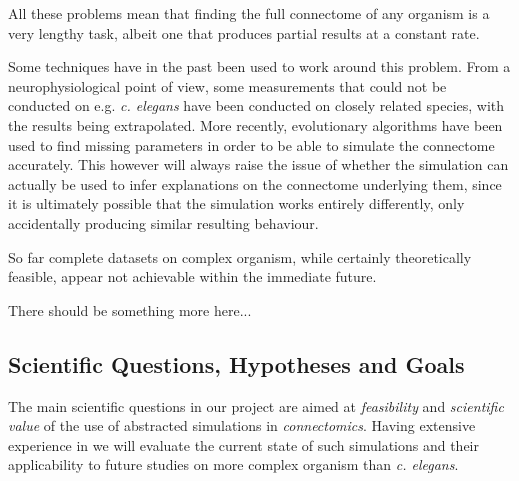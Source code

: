 \documentclass[a4paper,11pt]{article}
\begin{document}
All these problems mean that finding the full connectome of any organism is a very lengthy task, albeit one that produces partial results at a constant rate. 

Some techniques have in the past been used to work around this problem. From a neurophysiological point of view, some measurements that could not be conducted on e.g. \emph{c. elegans} have been conducted on closely related species, with the results being extrapolated. More recently, evolutionary algorithms have been used to find missing parameters in order to be able to simulate the connectome accurately. This however will always raise the issue of whether the simulation can actually be used to infer explanations on the connectome underlying them, since it is ultimately possible that the simulation works entirely differently, only accidentally producing similar resulting behaviour. 

So far complete datasets on complex organism, while certainly theoretically feasible, appear not achievable within the immediate future. 

There should be something more here... 

\subsection{Scientific Questions, Hypotheses and Goals}

The main scientific questions in our project are aimed at \emph{feasibility} and  \emph{scientific value} of the use of abstracted simulations in \emph {connectomics}. Having extensive experience in  we will evaluate the current state of such simulations and their applicability to future studies on more complex organism than \emph{c. elegans}. 
\end{document}
